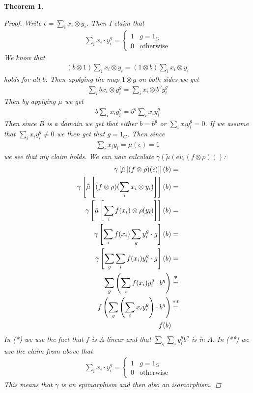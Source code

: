 \documentclass[11pt, a4paper, english]{article}
\numberwithin{prop}{section}
\numberwithin{lemma}{section}
\newtheorem{theorem}{Theorem}
\numberwithin{theorem}{section}
\numberwithin{defin}{section}
\numberwithin{example}{section}
\begin{document}
\begin{theorem}
\begin{proof}
Write $\epsilon = \sum\limits_i x_i \otimes y_i$. Then I claim that 
\begin{align*}
\sum_i x_i \cdot y_i^g = \begin{cases}
1 & g = 1_G\\
0 & \text{otherwise}
\end{cases}
\end{align*}
We know that 
\begin{align*}
(b \otimes 1)\sum_i x_i \otimes y_i = (1 \otimes b)\sum_i x_i \otimes y_i
\end{align*}
holds for all $b$. Then applying the map $1 \otimes g$ on both sides we get
\begin{align*}
\sum_i bx_i \otimes y_i^g = \sum_i x_i \otimes b^gy_i^g
\end{align*}
Then by applying $\mu$ we get 
\begin{align*}
b\sum_i x_i y_i^g = b^g\sum_i x_i  y_i^g
\end{align*}
Then since $B$ is a domain we get that either $b = b^g$ or $\sum_i x_i  y_i^g = 0$. If we assume that $\sum_i x_i  y_i^g \neq 0$ we then get that $g = 1_G$. Then since
\begin{align*}
\sum_i x_i  y_i = \mu(\epsilon) = 1
\end{align*}
we see that my claim holds. We can now calculate $\gamma(\tilde{\mu}(ev_\epsilon(f \otimes \rho)))$:
\begin{align*}
\gamma \left[ \tilde{\mu} \left[ (f \otimes \rho)(\epsilon) \right] \right] (b) &=\\ 
\gamma \left[ \tilde{\mu} \left[ (f \otimes \rho)(\sum_i x_i \otimes y_i) \right] \right] (b) &=\\
\gamma \left[ \tilde{\mu} \left[ \sum_i f(x_i) \otimes \rho(y_i) \right] \right] (b) &=\\
\gamma \left[ \sum_i f(x_i) \sum_g y_i^g \cdot g \right] (b) &=\\
\gamma \left[ \sum_g \sum_i f(x_i) y_i^g \cdot g \right] (b) &=\\
\sum_g \left(\sum_i f(x_i) y_i^g \cdot b^g \right) &\stackrel{\mathclap{\normalfont\mbox{*}}}{=}\\
f \left( \sum_g \left(\sum_i x_i y_i^g \right) \cdot b^g \right) &\stackrel{\mathclap{\normalfont\mbox{**}}}{=}\\
f(b) &
\end{align*}
In (*) we use the fact that $f$ is $A$-linear and that $\sum_g \sum_i y_i^g b^g$ is in $A$. In (**) we use the claim from above that 
\begin{align*}
\sum_i x_i \cdot y_i^g = \begin{cases}
1 & g = 1_G\\
0 & \text{otherwise}
\end{cases}
\end{align*}
This means that $\gamma$ is an epimorphism and then also an isomorphism.
\end{proof}
\end{theorem}
\end{document}
